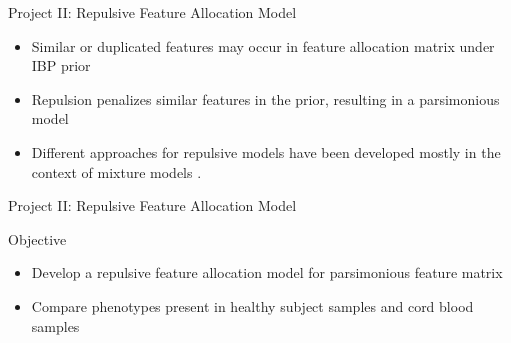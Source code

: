 \documentclass[ignorenonframetext,]{beamer}
\begin{document}



\begin{frame}{Project II: Repulsive Feature Allocation Model}
  \begin{itemize}
    \setlength\itemsep{1em}
    \item Similar or duplicated features may occur in feature allocation matrix under IBP prior
    \item Repulsion penalizes similar features in the prior, resulting in a parsimonious model
    \item Different approaches for repulsive models have been developed mostly
    in the context of mixture models \citep{petralia2012repulsive,
    quinlan2017parsimonious, xie2017bayesian, quinlan2017density}. 
  \end{itemize}
\end{frame}

\begin{frame}{Project II: Repulsive Feature Allocation Model}
  \begin{block}{Objective}
  \begin{itemize}
    \setlength\itemsep{1em}
    \item Develop a repulsive feature allocation model for parsimonious feature
      matrix
    \item Compare phenotypes present in healthy subject samples and cord blood samples
  \end{itemize}
\end{block}
\end{frame}
\end{document}
